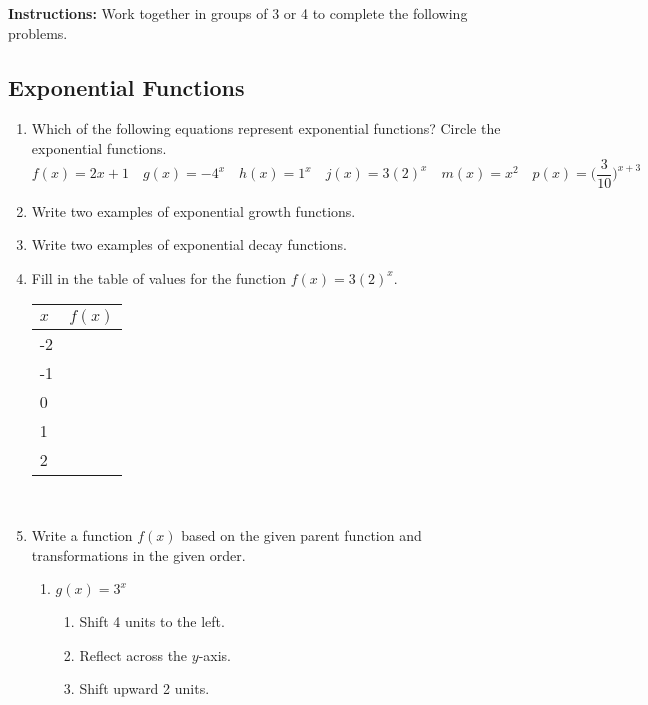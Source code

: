 


\noindent \textbf{Instructions:}  Work together in groups of  3 or 4 to complete the following problems.



\subsection{Exponential Functions}
\begin{enumerate}
\item Which of the following equations represent exponential functions?  Circle the exponential functions.
$$f(x)=2x+1 \quad  g(x)=-4^x \quad  h(x)=1^x \quad  j(x)=3(2)^x  \quad m(x)=x^2  \quad p(x)=\Big(\frac{3}{10}\Big)^{x+3} \quad$$

\item Write two examples of exponential growth functions.
\vfill

\item Write two examples of exponential decay functions.
\vfill

\item Fill in the table of values for the function $f(x)=3(2)^x$.\\

\begin{flushright}
\vspace{-.5in}
\renewcommand{\arraystretch}{2}
\begin{tabular}{|l|l|}
\hline
\textbf{$x$} & \textbf{$f(x)$} \\ \hline
-2           &                 \\ \hline
-1           &                 \\ \hline
0            &                 \\ \hline
1            &                 \\ \hline
2            &                 \\ \hline
\end{tabular}
\hspace{.5in}
\ 
\end{flushright}


\item Write a function $f(x)$ based on the given parent function and transformations in the given order.
\begin{enumerate}
\item $g(x)=3^x$ 
\begin{enumerate}
\item Shift 4 units to the left.
\item Reflect across the $y$-axis.
\item Shift upward 2 units.
\end{enumerate}


\end{enumerate}
\end{enumerate}
